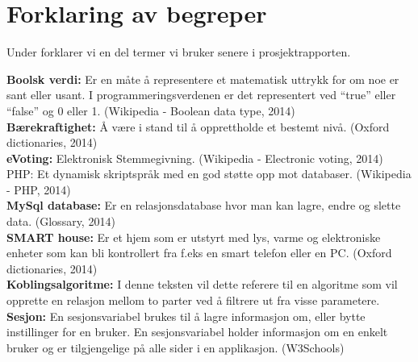 \section*{Forklaring av begreper}

Under forklarer vi en del termer vi bruker senere i prosjektrapporten.

{\bf Boolsk verdi:} Er en måte å representere et matematisk uttrykk for om noe er sant eller usant. I programmeringsverdenen er det representert ved ``true'' eller ``false'' og 0 eller 1. (Wikipedia - Boolean data type, 2014)\cite{website:wiki_boolean}\\

{\bf Bærekraftighet:} Å være i stand til å opprettholde et bestemt nivå. (Oxford dictionaries, 2014)\cite{website:sustainable}\\

{\bf eVoting:} Elektronisk Stemmegivning. (Wikipedia - Electronic voting, 2014)
PHP:  Et dynamisk skriptspråk med en god støtte opp mot databaser. (Wikipedia - PHP, 2014)\cite{website:wiki_evoting}\\

{\bf MySql database:} Er en relasjonsdatabase hvor man kan lagre, endre og slette data. (Glossary, 2014)\\

{\bf SMART house:} Er et hjem som er utstyrt med lys, varme og elektroniske enheter som kan bli kontrollert fra f.eks en smart telefon eller en PC. (Oxford dictionaries, 2014)\cite{website:smarthome}\\

{\bf Koblingsalgoritme:}  I denne teksten vil dette referere til en algoritme som vil opprette en relasjon mellom to parter ved å filtrere ut fra visse parametere.\\

{\bf Sesjon:} En sesjonsvariabel brukes til å lagre informasjon om, eller bytte instillinger for en bruker. En sesjonsvariabel holder informasjon om en enkelt bruker og er tilgjengelige på alle sider i en applikasjon. (W3Schools)\cite{website:sessionvariable}
